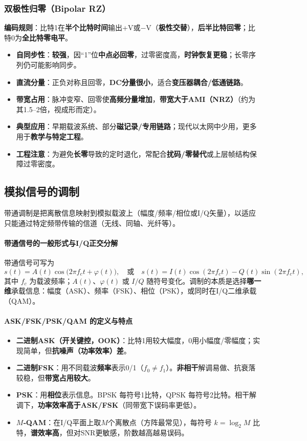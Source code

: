 \documentclass[lang=cn,newtx,10pt,scheme=chinese]{../../elegantbook}
\begin{document}
\subsubsection{双极性归零（Bipolar RZ）}
\textbf{编码规则}：比特1在\textbf{半个比特时间}输出+V或−V（\textbf{极性交替}），\textbf{后半比特回零}；比特0为\textbf{全比特零电平}。
\begin{itemize}
    \item \textbf{自同步性}：\textbf{较强}，因“1”位\textbf{中点必回零}，过零密度高，\textbf{时钟恢复更稳}；长零序列仍可能影响同步。
    \item \textbf{直流分量}：正负对称且回零，\textbf{DC分量很小}，适合\textbf{变压器耦合/低通链路}。
    \item \textbf{带宽占用}：脉冲变窄、回零使\textbf{高频分量增加}，\textbf{带宽大于AMI（NRZ）}（约为其1.5–2倍，视成形而定）。
    \item \textbf{典型应用}：早期载波系统、部分\textbf{磁记录/专用链路}；现代以太网中少用，更多用于\textbf{教学与特定工程}。
    \item \textbf{工程注意}：为避免\textbf{长零}导致的定时退化，常配合\textbf{扰码/零替代}或上层帧结构保障过零密度。
\end{itemize}

\subsection{模拟信号的调制}
带通调制是把离散信息映射到模拟载波上（幅度/频率/相位或I/Q矢量），以适应只能通过特定频带传输的信道（无线、同轴、光纤等）。

\paragraph{带通信号的一般形式与I/Q正交分解}
带通信号可写为
\[
    s(t)=A(t)\cos\bigl(2\pi f_c t+\varphi(t)\bigr),\quad \text{或}\quad s(t)=I(t)\cos(2\pi f_c t)-Q(t)\sin(2\pi f_c t),
\]
其中 $f_c$ 为载波频率；$A(t)$、$\varphi(t)$ 或 $I/Q$ 随符号变化。调制的本质是选择\textbf{哪一维}承载信息：幅度（ASK）、频率（FSK）、相位（PSK），或同时在I/Q二维承载（QAM）。

\paragraph{ASK/FSK/PSK/QAM 的定义与特点}
\begin{itemize}
    \item \textbf{二进制ASK（开关键控，OOK）}：比特1用较大幅度，0用小幅度/零幅度；实现简单，但\textbf{抗噪声（功率效率）差}。
    \item \textbf{二进制FSK}：用不同载波\textbf{频率}表示0/1（$f_0\neq f_1$）。\textbf{非相干}解调易做、抗衰落较稳，但\textbf{带宽占用较大}。
    \item \textbf{PSK}：用\textbf{相位}表示信息。BPSK 每符号1比特，QPSK 每符号2比特。相干解调下，\textbf{功率效率高于ASK/FSK}（同带宽下误码率更低）。
    \item \textbf{$M$‑QAM}：在I/Q平面上取$M$个离散点（方阵最常见），每符号 $k=\log_2 M$ 比特，\textbf{谱效率高}，但对SNR更敏感，阶数越高越易误码。
\end{itemize}
\end{document}
